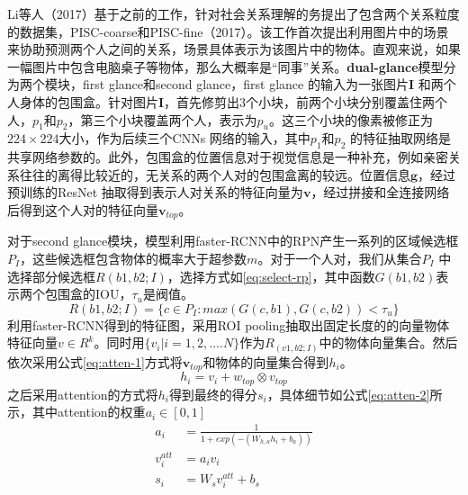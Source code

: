 Li等人（2017）\cite{li2017dual-glance}基于之前的工作，针对社会关系理解的务提出了包含两个关系粒度的数据集，PISC-coarse和PISC-fine（2017）\cite{li2017dual-glance}。该工作首次提出利用图片中的场景来协助预测两个人之间的关系，场景具体表示为该图片中的物体。直观来说，如果一幅图片中包含电脑桌子等物体，那么大概率是``同事''关系。\textbf{dual-glance}模型分为两个模块，first glance和second glance，first glance 的输入为一张图片$\mathbf{I}$ 和两个人身体的包围盒。针对图片$\mathbf{I}$，首先修剪出3个小块，前两个小块分别覆盖住两个人，$p_1$和$p_2$，第三个小块覆盖两个人，表示为$p_{u}$。这三个小块的像素被修正为$224 \times 224$大小，作为后续三个CNNs 网络的输入，其中$p_1$和$p_2$ 的特征抽取网络是共享网络参数的。此外，包围盒的位置信息对于视觉信息是一种补充，例如亲密关系往往的离得比较近的，无关系的两个人对的包围盒离的较远。位置信息$\mathbf{g}$，经过预训练的ResNet\cite{he2016deep} 抽取得到表示人对关系的特征向量为$\mathbf{v}$，经过拼接和全连接网络后得到这个人对的特征向量$\mathbf{v}_{top}$。

对于second glance模块，模型利用faster-RCNN\cite{ren2015faster}中的RPN产生一系列的区域候选框$P_{I}$，这些候选框包含物体的概率大于超参数$m$。对于一个人对，我们从集合$P_{I}$ 中选择部分候选框$R(b1,b2;I)$，选择方式如\ref{eq:select-rp}，其中函数$G(b1,b2)$表示两个包围盒的IOU，$\tau_{u}$是阀值。
\begin{equation}\label{eq:select-rp}
    R(b1,b2;I) = \{c \in P_{I} : max(G(c,b1),G(c,b2))<\tau_{u}\}
\end{equation}
利用faster-RCNN得到的特征图，采用ROI pooling抽取出固定长度的的向量物体特征向量$v \in R^{k}$。同时用$\{v_i|i=1, 2, .... N\}$作为$R_(v1,b2;I)$中的物体向量集合。然后依次采用公式\ref{eq:atten-1}方式将$\mathbf{v}_{top}$和物体的向量集合得到$h_i$。
\begin{equation}\label{eq:atten-1}
    h_i = v_i + w_{top} \otimes v_{top}
\end{equation}
之后采用attention的方式将$h_i$得到最终的得分$s_i$，具体细节如公式\ref{eq:atten-2}所示，其中attention的权重$a_{i} \in [0,1]$
\begin{equation} \label{eq:atten-2}
    \begin{split}
        a_{i} &= \frac{1}{1+exp(-(W_{h,a}h_{i}+b_{a}))} \\
        v^{att}_{i} &= a_{i}v_{i} \\
        s_{i} &= W_{s} v_{i}^{att} + b_{s}
    \end{split}
\end{equation}

